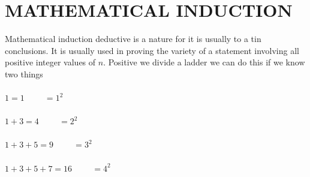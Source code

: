 \documentclass[11pt,a4paper]{article}
\begin{document}
\pagebreak
\section{MATHEMATICAL INDUCTION}
Mathematical induction deductive is a nature for it is usually to a tin conclusions. It is usually used in proving the variety of a statement involving all positive integer values of $n$. Positive we divide a ladder we can do this if we know two things\\\\
$1=1\hspace{1cm} =1^2$\\\\
$1+3=4\hspace{1cm} =2^2$\\\\
$1+3+5=9\hspace{1cm} =3^2$\\\\
$1+3+5+7=16\hspace{1cm} =4^2$\\\\
\end{document}
